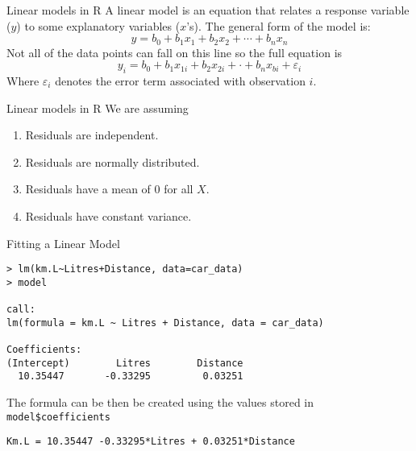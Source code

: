 \documentclass[xcolor=svgnames, 10pt, handout]{beamer}
\begin{document}
\begin{frame}[fragile]{Linear models in R}
\vfill
A linear model is an equation that relates a response variable ($y$) to some explanatory variables ($x$'s).  The general form of the model is:
$$y = b_0 + b_1x_1 + b_2x_2 + \cdots + b_nx_n$$
\vfill
Not all of the data points can fall on this line so the full equation is
$$y_i = b_0 + b_1 x_{1i} + b_2x_{2i} + \cdot + b_nx_{bi} + \varepsilon_i$$
\vfill
Where $\varepsilon_i$ denotes the error term associated with observation $i$.
\vfill
\end{frame}

\begin{frame}[fragile]{Linear models in R}
We are assuming
\begin{enumerate}
\item Residuals are independent.
\item Residuals are normally distributed.
\item Residuals have a mean of 0 for all $X$.
\item Residuals have constant variance.
\end{enumerate}
\end{frame}


\begin{frame}[fragile]{Fitting a Linear Model}
\begin{Verbatim}[xleftmargin=2em, xrightmargin=1.5em, frame=single, label=Using P-value, framesep=0.5em, commandchars=\\\{\}, fontsize=\small]
> lm(km.L~Litres+Distance, data=car_data)
> model

call:
lm(formula = km.L ~ Litres + Distance, data = car_data)

Coefficients:
(Intercept)        Litres        Distance
  10.35447       -0.33295         0.03251
\end{Verbatim}
The formula can be then be created using the values stored in \verb|model$coefficients|

\verb|Km.L = 10.35447 -0.33295*Litres + 0.03251*Distance|
\end{frame}
\end{document}

